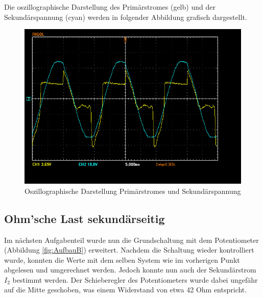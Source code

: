 \documentclass[12pt,a4paper,twoside]{article}
\begin{document}
\begin{table}[H]
    \centering
    \caption{Messwerte Leerlauf}
    \label{tab:messwerteLeerlauf}
\end{table}

\noindent
Die oszillographische Darstellung des Primärstromes (gelb) und der Sekundärspannung (cyan) werden in folgender Abbildung grafisch dargestellt.

\begin{figure}[H]
    \centering
    \includegraphics[width=0.6\linewidth, angle=0]{nudes/A1 Oszi.jpg}
    \caption{Oszillographische Darstellung Primärstromes und Sekundärspannung}
    \label{fig:OszilloskopA}
\end{figure}


\subsection{Ohm'sche Last sekundärseitig}

Im nächsten Aufgabenteil wurde nun die Grundschaltung mit dem Potentiometer (Abbildung \ref{fig:AufbauB}) erweitert. Nachdem die Schaltung wieder kontrolliert wurde, konnten die Werte mit dem selben System wie im vorherigen Punkt abgelesen und umgerechnet werden.
Jedoch konnte nun auch der Sekundärstrom $I_{2}$ bestimmt werden. Der Schieberegler des Potentiometers wurde dabei ungefähr auf die Mitte geschoben, was einem Widerstand von etwa 42 Ohm entspricht.

\begin{table}[H]
    \centering
    \caption{Messwerte Ohm'sche Last}
    \label{tab:messwerteOhm}
\end{table}
\end{document}

